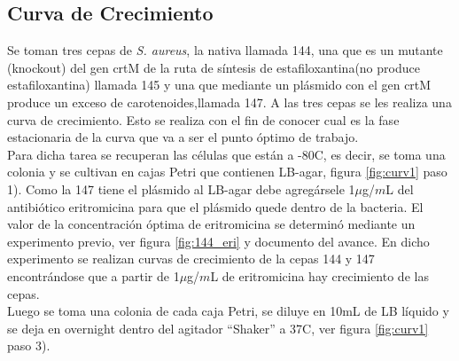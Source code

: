 \documentclass[%
 reprint,
 amsmath,amssymb,
 aps,
]{revtex4-2}
\begin{document}
\subsection{Curva de Crecimiento}
Se toman tres cepas de \textit{S. aureus}, la nativa llamada
144, una  que es un mutante (knockout) del gen crtM de la ruta
de s\'{i}ntesis de estafiloxantina(no produce estafiloxantina) llamada 145 y una que mediante un pl\'{a}smido con el gen crtM produce un exceso de carotenoides,llamada 147. A las tres cepas se les realiza una curva de crecimiento. Esto se realiza con el fin de conocer cual es la fase estacionaria
de la curva que va a ser el punto \'{o}ptimo de trabajo.\\

Para dicha tarea se recuperan las c\'{e}lulas que est\'{a}n a -80\textdegree C, es decir, se toma una colonia y se cultivan en cajas Petri que contienen LB-agar, figura \ref{fig:curv1} paso 1). Como la 147 tiene el pl\'{a}smido al LB-agar debe agreg\'{a}rsele 1$\mu$g/$m$L del antibi\'{o}tico eritromicina para que el pl\'{a}smido quede dentro de la bacteria. El valor de la concentraci\'{o}n \'{o}ptima de eritromicina se determin\'{o} mediante un experimento previo, ver figura \ref{fig:144_eri} y documento del avance. En dicho experimento se realizan curvas de crecimiento de la cepas 144  y 147 encontr\'{a}ndose que a partir de 1$\mu$g/$m$L de eritromicina hay crecimiento de las cepas.\\

Luego se toma una colonia de cada caja Petri, se diluye en 10mL de LB l\'{i}quido y se deja en overnight dentro del agitador ``Shaker'' a  37\textdegree C, ver figura \ref{fig:curv1} paso 3).\\
\end{document}
